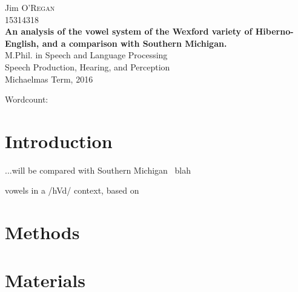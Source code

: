 \documentclass[11pt]{article}
\begin{document}
\begin{titlepage}

\newcommand{\HRule}{\rule{\linewidth}{0.5mm}}

\center

\begin{minipage}{0.8\textwidth}
\begin{flushleft} \large
Jim \textsc{O'Regan}
\\
{\large 15314318} \\[1.5cm]

{ \large \bfseries An analysis of the vowel system of the Wexford variety of Hiberno-English, and a comparison with Southern Michigan.}\\[1.5cm]

M.Phil. in Speech and Language Processing
\\
{\large Speech Production, Hearing, and Perception} \\
{\large Michaelmas Term, 2016}
\end{flushleft}
\end{minipage}

\begin{minipage}[t][10cm][b]{0.5\textwidth}
\begin{flushleft} \large
Wordcount: 
\\
\end{flushleft}
\end{minipage}


\vfill

\end{titlepage}

\section{Introduction}

...will be compared with Southern Michigan~\citep{hillenbrand2003american} blah~\citep{hillenbrand1995acoustic}

vowels in a /hVd/ context, based on \cite[p. 175]{peterson1952control}

\section{Methods}

\section{Materials}
\end{document}
